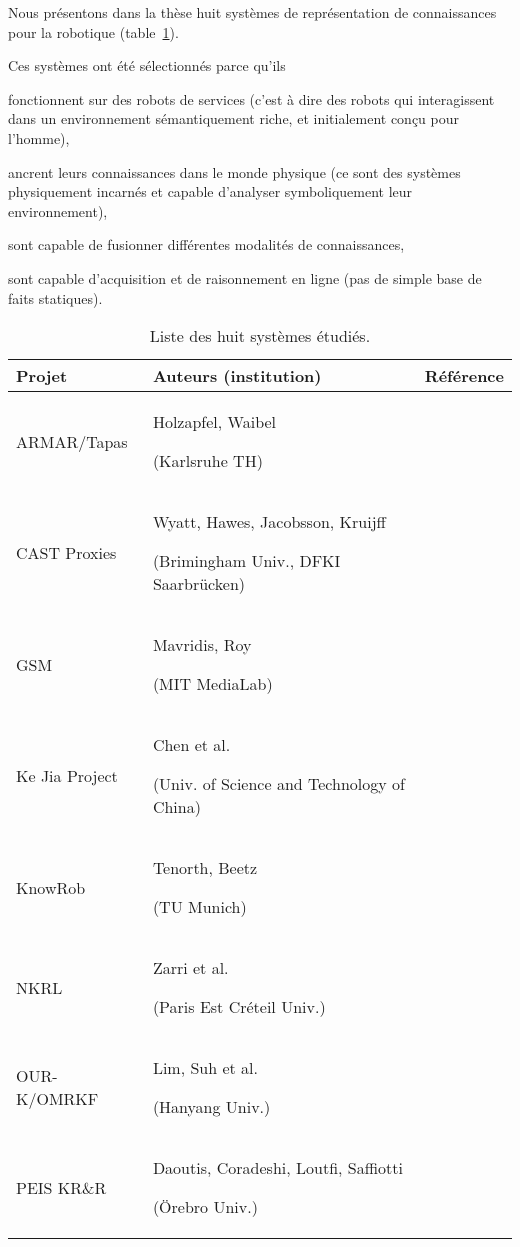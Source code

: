 Nous présentons dans la thèse huit systèmes de représentation de connaissances pour la robotique (table~\ref{table|surveyed-systems}).

Ces systèmes ont été sélectionnés parce qu'ils
\begin{inparaenum} 
    \item fonctionnent sur des robots de services (c'est à dire des robots qui interagissent dans un environnement sémantiquement riche, et initialement conçu pour l'homme),
    \item  ancrent leurs connaissances dans le monde physique (ce sont des systèmes physiquement incarnés et capable d'analyser symboliquement leur environnement),
    \item  sont capable de fusionner différentes modalités de connaissances,
    \item  sont capable d'acquisition et de raisonnement en ligne (pas de simple base de faits statiques).
\end{inparaenum}


\begin{table}\scriptsize
\begin{center}

\begin{tabular}{p{2.2cm}p{6cm}p{2cm}}
\toprule
{\bf Projet} & {\bf Auteurs (institution)} & Référence \\
\midrule
ARMAR/Tapas & Holzapfel, Waibel \par (Karlsruhe TH) & \cite{Holzapfel2008}\\
CAST Proxies & Wyatt, Hawes, Jacobsson, Kruijff \par (Brimingham Univ., DFKI Saarbrücken) & \cite{Jacobsson2008} \\
GSM & Mavridis, Roy \par (MIT MediaLab) & \cite{Mavridis2006} \\
Ke Jia Project & Chen et al. \par (Univ. of Science and Technology of China) & \cite{Chen2010} \\
{\sc KnowRob} & Tenorth, Beetz \par (TU Munich) & \cite{Tenorth2009a} \\
NKRL & Zarri et al. \par (Paris Est Créteil Univ.) & \cite{Sabri2011} \\
OUR-K/OMRKF & Lim, Suh et al. \par (Hanyang Univ.) & \cite{Lim2011, Suh2007} \\
PEIS KR\&R & Daoutis, Coradeshi, Loutfi, Saffiotti \par (Örebro Univ.) & \cite{Daoutis2009} \\

\bottomrule

\end{tabular}
\end{center}

\caption{Liste des huit systèmes étudiés.}

\label{table|surveyed-systems}
\end{table}


